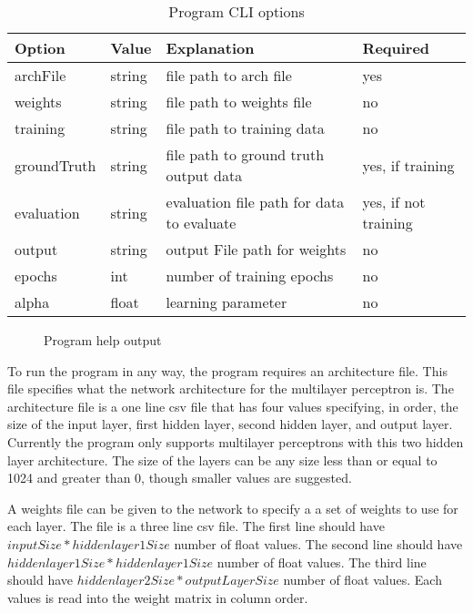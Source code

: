\documentclass[jair, twoside,11pt,theapa]{article}
\begin{document}
\begin{table}
\centering
\caption{Program CLI options}
\label{ProgramOptions}
\begin{tabular}{|l|l|l|l|}
\hline
Option & Value & Explanation & Required \\ \hline
archFile    & string & file path to arch file & yes \\ \hline
weights    & string & \small{file path to weights file} & no \\ \hline
training    & string & file path to training data & no \\ \hline
groundTruth    & string & file path to ground truth output data  & yes, if training \\ \hline
evaluation    & string &evaluation file path for data to evaluate & yes, if not training \\ \hline
output    & string & output File path for weights & no\\ \hline
epochs    & int & number of training epochs & no\\ \hline
alpha    & float & learning parameter & no\\ \hline
\end{tabular}
\end{table}

\begin{figure}[h]
    \centering
    \caption{Program help output}
    \label{HelpOutput}
\end{figure}

To run the program in any way, the program requires an architecture file. 
This file specifies what the network architecture for the multilayer perceptron is. 
The architecture file is a one line csv file that has four values specifying, in order, the size of the input layer, first hidden layer, second hidden layer, and output layer. 
Currently the program only supports multilayer perceptrons with this two hidden layer architecture.
The size of the layers can be any size less than or equal to 1024 and greater than 0, though smaller values are suggested.

A weights file can be given to the network to specify a a set of weights to use for each layer. 
The file is a three line csv file. 
The first line should have $inputSize * hiddenlayer1Size$ number of float values. 
The second line should have $hiddenlayer1Size * hiddenlayer1Size$ number of float values. 
The third line should have $hiddenlayer2Size * outputLayerSize$ number of float values. 
Each values is read into the weight matrix in column order. 
\end{document}
